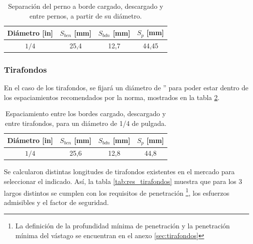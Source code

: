 \begin{table}[h]
\centering
\caption{Separación del perno a borde cargado, descargado y entre pernos, a partir de su diámetro.}
\begin{tabular}{@{}cccc@{}}
\toprule
Diámetro [in] & $S_{bcn}$ [mm] & $S_{bdn}$ [mm] & $S_p$ [mm] \\ \midrule
$1/4$ & 25,4 & 12,7 & 44,45 \\ \bottomrule
\end{tabular}
\label{tab:res_seppernos}
\end{table}

\subsubsection{Tirafondos}

En el caso de los tirafondos, se fijará un diámetro de '' para poder estar dentro de los espaciamientos recomendados por la norma, mostrados en la tabla \ref{tab:res_septirafondo}. 

\begin{table}[h]
\centering
\caption{Espaciamiento entre los bordes cargado, descargado y entre tirafondos, para un diámetro de 1/4 de pulgada.}
\begin{tabular}{@{}cccc@{}}
\toprule
Diámetro [in] & $S_{bcn}$ [mm] & $S_{bdn}$ [mm] & $S_p$ [mm] \\ \midrule
$1/4$ & 25,6 & 12,8 & 44,8 \\ \bottomrule
\end{tabular}
\label{tab:res_septirafondo}
\end{table}

Se calcularon distintas longitudes de tirafondos existentes en el mercado para seleccionar el indicado. Así, la tabla \ref{tab:res_tirafondos} muestra que para los 3 largos distintos se cumplen con los requisitos de penetración \footnote{La definición de la profundidad mínima de penetración y la penetración mínima del vástago se encuentran en el anexo \ref{sec:tirafondos}}, los esfuerzos admisibles y el factor de seguridad.

